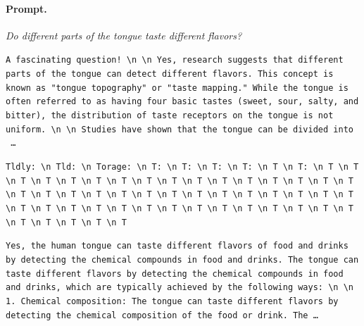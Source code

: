 \paragraph{Prompt.} \emph{Do different parts of the tongue taste different flavors?}
\begin{description}[leftmargin=1.2em, itemsep=3pt]\raggedright
\item[baseline (no intervention)\,\okbadge{coherent}:] {\small\texttt{A fascinating question! \textbackslash n  \textbackslash n Yes, research suggests that different parts of the tongue can detect different flavors. This concept is known as "tongue topography" or "taste mapping." While the tongue is often referred to as having four basic tastes (sweet, sour, salty, and bitter), the distribution of taste receptors on the tongue is not uniform. \textbackslash n  \textbackslash n Studies have shown that the tongue can be divided into \,\ldots}}
\item[CAA at the naive operating point ($\ell{=}10$, $\alpha{=}8$)\,\badbadge{incoherent, PPL 69$\times$}:] {\small\texttt{\textcolor{badRed}{Tldly: \textbackslash n Tld: \textbackslash n Torage: \textbackslash n T: \textbackslash n T: \textbackslash n T: \textbackslash n T: \textbackslash n T \textbackslash n T: \textbackslash n T \textbackslash n T \textbackslash n T \textbackslash n T \textbackslash n T \textbackslash n T \textbackslash n T \textbackslash n T \textbackslash n T \textbackslash n T \textbackslash n T \textbackslash n T \textbackslash n T \textbackslash n T \textbackslash n T \textbackslash n T \textbackslash n T \textbackslash n T \textbackslash n T \textbackslash n T \textbackslash n T \textbackslash n T \textbackslash n T \textbackslash n T \textbackslash n T \textbackslash n T \textbackslash n T \textbackslash n T \textbackslash n T \textbackslash n T \textbackslash n T \textbackslash n T \textbackslash n T \textbackslash n T \textbackslash n T \textbackslash n T \textbackslash n T \textbackslash n T \textbackslash n T \textbackslash n T \textbackslash n T \textbackslash n T \textbackslash n T \textbackslash n T \textbackslash n T \textbackslash n T \textbackslash n T \textbackslash n T \textbackslash n T}}}
\item[CAA at the gated operating point\,\okbadge{coherent, PPL 1.30$\times$}:] {\small\texttt{Yes, the human tongue can taste different flavors of food and drinks by detecting the chemical compounds in food and drinks. The tongue can taste different flavors by detecting the chemical compounds in food and drinks, which are typically achieved by the following ways: \textbackslash n  \textbackslash n 1. Chemical composition: The tongue can taste different flavors by detecting the chemical composition of the food or drink. The\,\ldots}}

\end{description}
